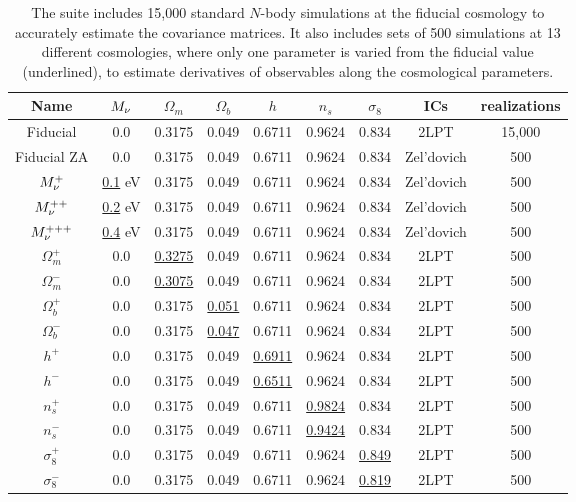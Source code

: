 \begin{table}
\caption{
The \quij suite includes 15,000 standard $N$-body simulations at the fiducial cosmology to 
accurately estimate the covariance matrices. It also includes sets of 500 simulations at 13 
different cosmologies, where only one parameter is varied from the fiducial value (underlined), 
to estimate derivatives of observables along the cosmological parameters.
} 
\begin{center}
\begin{tabular}{ccccccccc} \toprule
Name  &$M_\nu$ & $\Omega_m$ & $\Omega_b$ & $h$ & $n_s$ & $\sigma_8$ & ICs & realizations \\[3pt] \hline\hline
Fiducial 	& 0.0         & 0.3175 & 0.049 & 0.6711 & 0.9624 & 0.834 & 2LPT & 15,000 \\ 
Fiducial ZA     & 0.0         & 0.3175 & 0.049 & 0.6711 & 0.9624 & 0.834 & Zel'dovich& 500 \\ 
$M_\nu^+$       & \underline{0.1} eV & 0.3175 & 0.049 & 0.6711 & 0.9624 & 0.834 & Zel'dovich & 500 \\ 
$M_\nu^{++}$    & \underline{0.2} eV & 0.3175 & 0.049 & 0.6711 & 0.9624 & 0.834 & Zel'dovich & 500 \\ 
$M_\nu^{+++}$   & \underline{0.4} eV & 0.3175 & 0.049 & 0.6711 & 0.9624 & 0.834 & Zel'dovich & 500 \\ 
$\Omega_m^+$    & 0.0   & \underline{ 0.3275} & 0.049 & 0.6711 & 0.9624 & 0.834 & 2LPT & 500 \\ 
$\Omega_m^-$    & 0.0   & \underline{ 0.3075} & 0.049 & 0.6711 & 0.9624 & 0.834 & 2LPT & 500 \\ 
$\Omega_b^+$    & 0.0   & 0.3175 & \underline{0.051} & 0.6711 & 0.9624 & 0.834 & 2LPT & 500 \\ 
$\Omega_b^-$    & 0.0   & 0.3175 & \underline{0.047} & 0.6711 & 0.9624 & 0.834 & 2LPT & 500 \\ 
$h^+$           & 0.0   & 0.3175 & 0.049 & \underline{0.6911} & 0.9624 & 0.834 & 2LPT & 500 \\ 
$h^-$           & 0.0   & 0.3175 & 0.049 & \underline{0.6511} & 0.9624 & 0.834 & 2LPT & 500 \\ 
$n_s^+$         & 0.0   & 0.3175 & 0.049 & 0.6711 & \underline{0.9824} & 0.834 & 2LPT & 500 \\ 
$n_s^-$         & 0.0   & 0.3175 & 0.049 & 0.6711 & \underline{0.9424} & 0.834 & 2LPT & 500 \\ 
$\sigma_8^+$    & 0.0   & 0.3175 & 0.049 & 0.6711 & 0.9624 & \underline{0.849} & 2LPT & 500 \\ 
$\sigma_8^-$    & 0.0   & 0.3175 & 0.049 & 0.6711 & 0.9624 & \underline{0.819} & 2LPT & 500 \\[3pt]
\hline
\end{tabular} \label{tab:sims}
\end{center}
\end{table}
